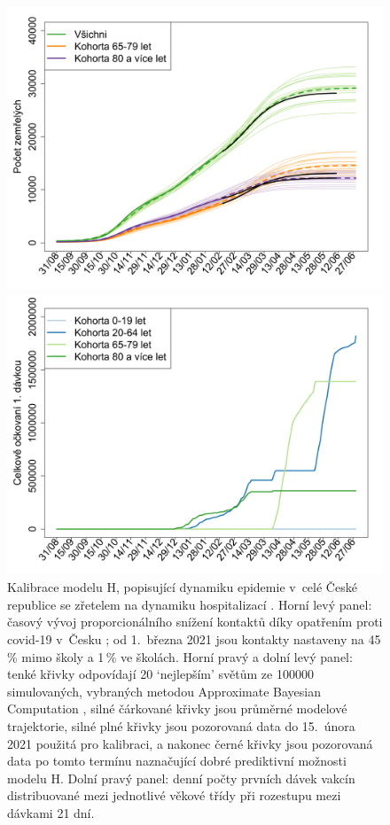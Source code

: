 \begin{figure}[ht]
\begin{center}
\begin{minipage}[m]{0.45\linewidth}
			\includegraphics[width=\textwidth]{pic/vakcinace-death.png}
		\end{minipage} 
		\begin{minipage}[m]{0.45\linewidth}
			\includegraphics[width=\textwidth]{pic/vakcinace-davky.png}
		\end{minipage} 
	\end{center}
	\caption{Kalibrace modelu H, popisující dynamiku epidemie v~celé České republice se zřetelem na dynamiku hospitalizací \cite{vaccpaper}. Horní levý panel: časový vývoj proporcionálního snížení kontaktů díky opatřením proti covid-19 v~Česku \cite{paqcovid}; od 1.\ března 2021 jsou kontakty nastaveny na 45\,\% mimo školy a 1\,\% ve školách. Horní pravý a dolní levý panel: tenké křivky odpovídají 20 `nejlepším' světům ze 100000 simulovaných, vybraných metodou Approximate Bayesian Computation \cite{Toni_etal2009}, silné čárkované křivky jsou průměrné modelové trajektorie, silné plné křivky jsou pozorovaná data do 15.\ února 2021 použitá pro kalibraci, a nakonec černé křivky jsou pozorovaná data po tomto termínu naznačující dobré prediktivní možnosti modelu H. Dolní pravý panel: denní počty prvních dávek vakcín distribuované mezi jednotlivé věkové třídy při rozestupu mezi dávkami 21 dní.}
	\label{kalibraceH}
\end{figure}

